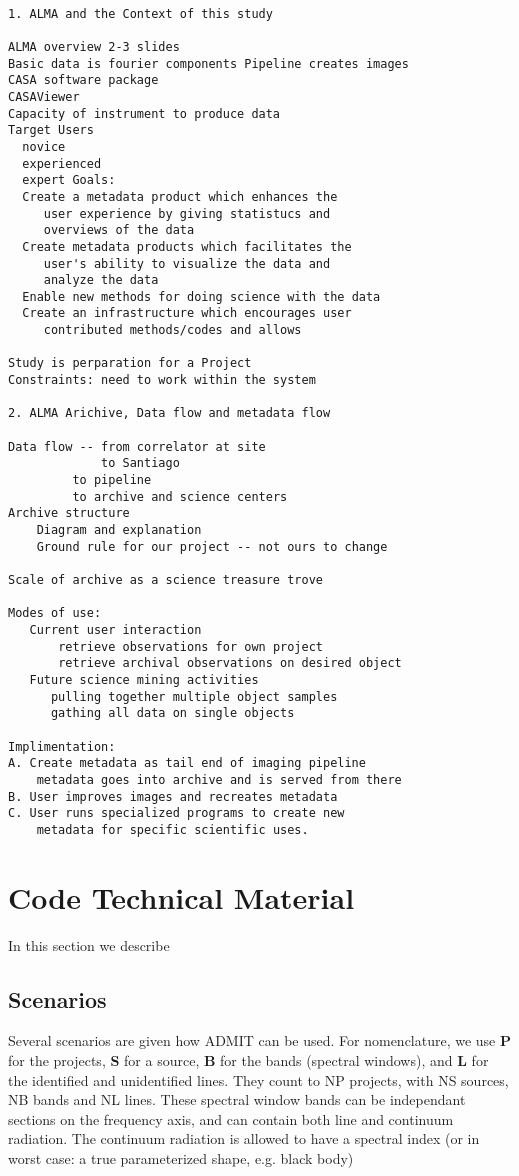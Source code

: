 \documentclass[preprint]{aastex} %
\begin{document}
\begin{verbatim}

1. ALMA and the Context of this study

ALMA overview 2-3 slides
Basic data is fourier components Pipeline creates images
CASA software package
CASAViewer
Capacity of instrument to produce data
Target Users
  novice
  experienced
  expert Goals:
  Create a metadata product which enhances the
     user experience by giving statistucs and
     overviews of the data
  Create metadata products which facilitates the
     user's ability to visualize the data and
     analyze the data
  Enable new methods for doing science with the data
  Create an infrastructure which encourages user
     contributed methods/codes and allows

Study is perparation for a Project
Constraints: need to work within the system

2. ALMA Arichive, Data flow and metadata flow

Data flow -- from correlator at site
             to Santiago
         to pipeline
         to archive and science centers
Archive structure
    Diagram and explanation
    Ground rule for our project -- not ours to change

Scale of archive as a science treasure trove

Modes of use:
   Current user interaction
       retrieve observations for own project
       retrieve archival observations on desired object
   Future science mining activities
      pulling together multiple object samples
      gathing all data on single objects

Implimentation:
A. Create metadata as tail end of imaging pipeline
    metadata goes into archive and is served from there
B. User improves images and recreates metadata
C. User runs specialized programs to create new
    metadata for specific scientific uses.
\end{verbatim}

\section{Code Technical Material}

In this section we describe

\subsection{Scenarios}

Several scenarios are given how ADMIT can be used.  For nomenclature, we use {\bf P} for
the projects, {\bf S} for a source, {\bf B} for the bands (spectral windows), and 
{\bf L} for the identified and unidentified lines. They count to 
NP projects, with NS sources, NB bands and NL lines.
These spectral window bands can be independant sections on the frequency axis, 
and can contain both line and continuum radiation. The continuum radiation is 
allowed to have a spectral 
index (or in worst case: a true parameterized shape, e.g. black body)
\end{document}
